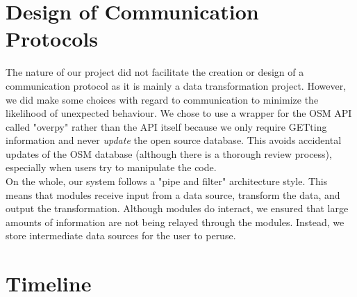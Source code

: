 \documentclass[12pt, titlepage]{article}
\begin{document}
\section{Design of Communication Protocols}
\noindent The nature of our project did not facilitate the creation or design of a communication protocol as it is mainly a data transformation project. However, we did make some choices with regard to communication to minimize the likelihood of unexpected behaviour. We chose to use a wrapper for the OSM API called "overpy" rather than the API itself because we only require GETting information and never \textit{update} the open source database. This avoids accidental updates of the OSM database (although there is a thorough review process), especially when users try to manipulate the code.  \\

\noindent On the whole, our system follows a "pipe and filter" architecture style. This means that modules receive input from a data source, transform the data, and output the transformation. Although modules do interact, we ensured that large amounts of information are not being relayed through the modules. Instead, we store intermediate data sources for the user to peruse. \\

\section{Timeline}
\end{document}
